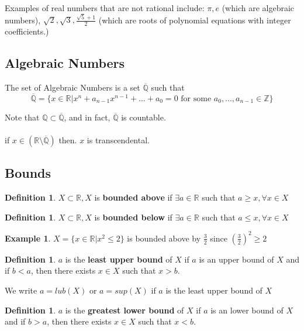 \documentclass[12pt]{article}
\theoremstyle{plain}
\theoremstyle{definition}
\newtheorem{definition}[theorem]{Definition}
\newtheorem{example}[theorem]{Example}
\begin{document}
Examples of real numbers that are not rational include: $\pi, e$ (which are algebraic numbers), $\sqrt{2}, \sqrt{3}, \frac{\sqrt{5}+1}{2}$ (which are roots of polynomial equations with integer coefficients.)

\subsection{Algebraic Numbers}

The set of Algebraic Numbers is a set $\overline{\mathbb{Q}}$ such that
$$\overline{\mathbb{Q}} = \{ x\in \mathbb{R} | x^n+ a_{n-1} x^{n-1} + ... + a_0 = 0 \text{ for some } a_0,...,a_{n-1} \in \mathbb{Z} \}$$

Note that $\mathbb{Q} \subset \overline{\mathbb{Q}}$, and in fact, $\overline{\mathbb{Q}}$ is countable.\\
\\
if $x \in (\mathbb{R} \setminus \overline{\mathbb{Q}})$ then. $x$ is transcendental.

\subsection{Bounds}

\begin{definition}
	$X \subset \mathbb{R}, X$ is \textbf{bounded above} if $\exists a \in \mathbb{R}$ such that $a \geq x, \forall x \in X$
\end{definition}

\begin{definition}
	$X \subset \mathbb{R}, X$ is \textbf{bounded below} if $\exists a \in \mathbb{R}$ such that $a \leq x, \forall x \in X$
\end{definition}

\begin{example}
	$X = \{ x\in\mathbb{R} | x^2 \leq 2 \}$ is bounded above by $\frac{3}{2}$ since $(\frac{3}{2})^2 \geq 2$
\end{example}

\begin{definition}
$a$ is the \textbf{least upper bound} of $X$ if $a$ is an upper bound of $X$ and if $b<a$, then there exists $x\in X$ such that $x > b$.
\end{definition}

We write $a = lub(X)$ or $a=sup(X)$ if $a$ is the least upper bound of $X$

\begin{definition}
$a$ is the \textbf{greatest lower bound} of $X$ if $a$ is an lower bound of $X$ and if $b>a$, then there exists $x\in X$ such that $x < b$.
\end{definition}
\end{document}
